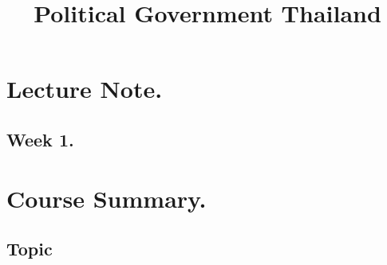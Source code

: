\documentclass[11pt]{book}
\title{Political Government Thailand}
\begin{document}
\maketitle
\part{Lecture Note.}
\chapter{Week 1.}

\part{Course Summary.}
\chapter{Topic}
\end{document}
